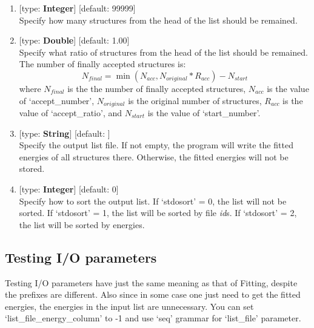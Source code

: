 \documentclass[11pt]{book}
\begin{document}
\begin{enumerate}
\item {} [type: \textbf{Integer}] [default: 99999] \\
	Specify how many structures from the head of the list should be remained.
\item {} [type: \textbf{Double}] [default: 1.00] \\
	Specify what ratio of structures from the head of the list should be remained. The number of finally accepted structures is:
	\begin{equation}
		N_{final} = \min (N_{acc}, N_{original} * R_{acc}) - N_{start}
	\end{equation}
	where $N_{final}$ is the the number of finally accepted structures, $N_{acc}$ is the value of `accept\_number', $N_{original}$ is the original number of structures, 
	$R_{acc}$ is the value of `accept\_ratio', and $N_{start}$ is the value of `start\_number'.
\item {} [type: \textbf{String}] [default: ] \\
	Specify the output list file. If not empty, the program will write the fitted energies of all structures there. 
	Otherwise, the fitted energies will not be stored.
\item {} [type: \textbf{Integer}] [default: 0] \\
	Specify how to sort the output list. If `stdosort' = 0, the list will not be sorted. If `stdosort' = 1, the list will be sorted by file \emph{id}s. 
	If `stdosort' = 2, the list will be sorted by energies.
\end{enumerate}

\subsection{Testing I/O parameters}

Testing I/O parameters have just the same meaning as that of Fitting, despite the prefixes are different. Also since in some case one just need to get 
the fitted energies, the energies in the input list are unnecessary. You can set `list\_file\_energy\_column' to -1 and use `seq' grammar for `list\_file' parameter. 
\end{document}
